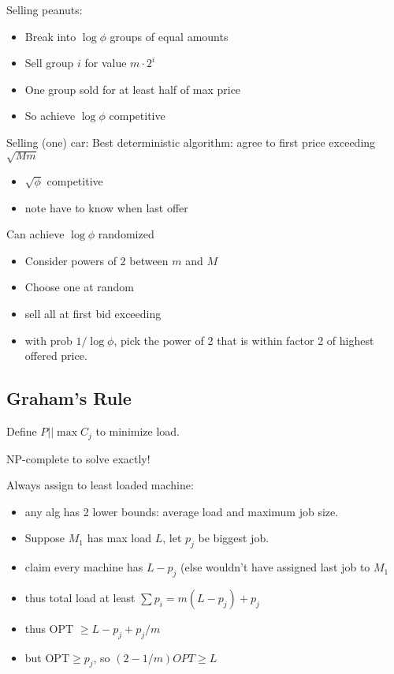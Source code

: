 \documentclass{article}
\begin{document}
Selling peanuts:
\begin{itemize}
\item Break into $\log \phi$ groups of equal amounts
\item Sell group $i$ for value $m \cdot 2^i$
\item One group sold for at least half of max price
\item So achieve $\log \phi$ competitive
\end{itemize}

Selling (one) car:
Best deterministic algorithm: agree to first price exceeding
$\sqrt{Mm}$ 
\begin{itemize}
\item $\sqrt{\phi}$ competitive
\item note have to know when last offer
\end{itemize}

Can achieve $\log \phi$ randomized
\begin{itemize}
\item Consider powers of 2 between $m$ and $M$
\item Choose one at random
\item sell all at first bid exceeding 
\item with prob $1/\log \phi$, pick the power of 2 that is within
  factor 2 of highest offered price.
\end{itemize}

\subsection*{Graham's Rule}

Define $P||\max C_j$ to minimize load.

NP-complete to solve exactly!

Always assign to least loaded machine:
\begin{itemize}
\item any alg has 2 lower bounds: average load and maximum job size.
\item Suppose $M_1$ has max load $L$, let $p_j$ be biggest job.
\item claim every machine has $L-p_j$ (else wouldn't have assigned
  last job to $M_1$
\item thus total load at least $\sum p_i = m(L-p_j)+p_j$
\item thus OPT $\ge L-p_j+p_j/m$
\item but OPT$\ge p_j$, so $(2-1/m)OPT \ge L$
\end{itemize}
\end{document}
